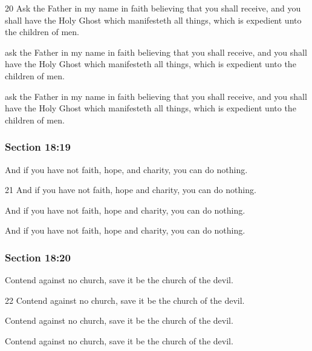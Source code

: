 		\begin{framed}
		\scriptsize
			\begin{compactdesc}
				\item[JSP] 20 Ask the Father in my name in faith believing that you shall receive, and you shall have the Holy Ghost which manifesteth all things, which is expedient unto the children of men.
				\item[DC 1835] ask the Father in my name in faith believing that you shall receive, and you shall have the Holy Ghost which manifesteth all things, which is expedient unto the children of men. 
				\item[DC 1844] ask the Father in my name in faith believing that you shall receive, and you shall have the Holy Ghost which manifesteth all things, which is expedient unto the children of men. 
			\end{compactdesc}
		\end{framed}

	\subsubsection{Section 18:19} %
		\label{DC18-19}

		And if you have not faith, hope, and charity, you can do nothing.

		\begin{framed}
		\scriptsize
			\begin{compactdesc}
				\item[JSP] 21 And if you have not faith, hope and charity, you can do nothing.
				\item[DC 1835] And if you have not faith, hope and charity, you can do nothing. 
				\item[DC 1844] And if you have not faith, hope and charity, you can do nothing. 
			\end{compactdesc}
		\end{framed}

	\subsubsection{Section 18:20} %
		\label{DC18-20}

		Contend against no church, save it be the church of the devil.

		\begin{framed}
		\scriptsize
			\begin{compactdesc}
				\item[JSP] 22 Contend against no church, save it be the church of the devil.
				\item[DC 1835] Contend against no church, save it be the church of the devil. 
				\item[DC 1844] Contend against no church, save it be the church of the devil. 
			\end{compactdesc}
		\end{framed}

